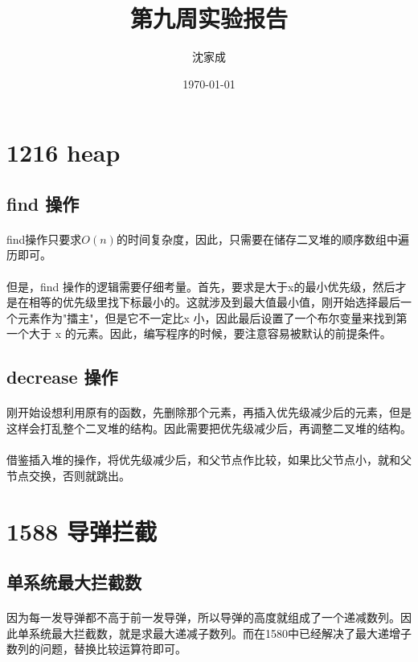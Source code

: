 \documentclass[UTF-8, 12pt]{ctexart}
\title{第九周实验报告}
\author{沈家成}
\date{\today}
\begin{document}
\maketitle
\section{1216 heap}
    \subsection{find 操作}
    \paragraph{}
    find操作只要求$O(n)$的时间复杂度，因此，只需要在储存二叉堆的顺序数组中遍历即可。
    \paragraph{}
    但是，find 操作的逻辑需要仔细考量。首先，要求是大于x的最小优先级，然后才是在相等的优先级里找下标最小的。这就涉及到最大值最小值，刚开始选择最后一个元素作为"擂主"，但是它不一定比x 小，因此最后设置了一个布尔变量来找到第一个大于 x 的元素。因此，编写程序的时候，要注意容易被默认的前提条件。

    \subsection{decrease 操作}
    \paragraph{}
    刚开始设想利用原有的函数，先删除那个元素，再插入优先级减少后的元素，但是这样会打乱整个二叉堆的结构。因此需要把优先级减少后，再调整二叉堆的结构。
    \paragraph{}
    借鉴插入堆的操作，将优先级减少后，和父节点作比较，如果比父节点小，就和父节点交换，否则就跳出。
	    
\section{1588 导弹拦截}
	\subsection{单系统最大拦截数}
    \paragraph{}
    因为每一发导弹都不高于前一发导弹，所以导弹的高度就组成了一个递减数列。因此单系统最大拦截数，就是求最大递减子数列。而在1580中已经解决了最大递增子数列的问题，替换比较运算符即可。
\end{document}
